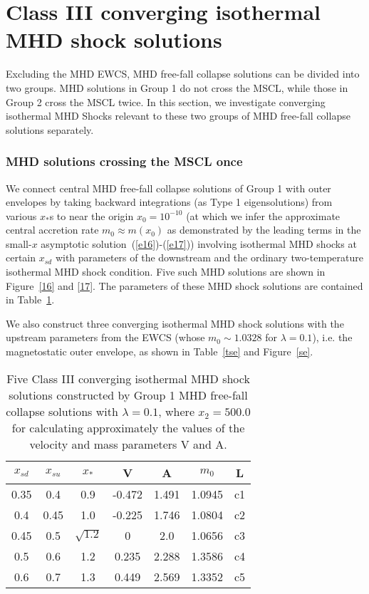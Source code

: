 \documentclass[fleqn,usenatbib]{mnras}
\begin{document}
\section{Class III converging isothermal MHD shock solutions}
\label{a4}


Excluding the MHD EWCS, MHD free-fall collapse solutions can be divided into two groups. MHD solutions in Group 1 do not cross the MSCL, while those in Group 2 cross the MSCL twice. In this section, we investigate converging isothermal MHD Shocks relevant to these two groups of MHD free-fall collapse solutions separately.  

\subsubsection{MHD solutions crossing the MSCL once}
\label{s5.3.1}
We connect central MHD free-fall collapse solutions of Group 1 with outer envelopes by taking backward integrations (as Type 1 eigensolutions) from various $x_{*}$s to near the origin $x_{0}=10^{-10}$ (at which we infer the approximate central accretion rate $m_{0}\approx m(x_{0})$ as demonstrated by the leading terms in the small-$x$ asymptotic solution~(\ref{e16})-(\ref{e17})) involving isothermal MHD shocks at certain $x_{sd}$ with parameters of the downstream and the ordinary two-temperature isothermal MHD shock condition. Five such MHD solutions are shown in Figure~\ref{16} and \ref{17}. The parameters of these MHD shock solutions are contained in Table~\ref{t4}.

We also construct three converging isothermal MHD shock solutions with the upstream parameters from the EWCS (whose $m_{0}\sim 1.0328$ for $\lambda=0.1$), i.e. the magnetostatic outer envelope, as shown in Table~\ref{tse} and Figure~\ref{se}. 

\begin{table}
\centering
\caption{Five Class III converging isothermal MHD shock solutions constructed by Group 1 MHD free-fall collapse solutions with $\lambda=0.1$, where $x_{2}=500.0$ for calculating approximately the values of the velocity and mass parameters V and A.}
\begin{tabular}{ccccccc}
\hline
$x_{sd}$ & $x_{su}$ & $x_{*}$ & V & A & $m_{0}$ & L\\
\hline
0.35 & 0.4 & 0.9 & -0.472 & 1.491 & 1.0945 & c1\\
0.4 & 0.45 & 1.0 & -0.225 & 1.746 & 1.0804 & c2\\
0.45 & 0.5 & $\sqrt{1.2}$ & 0 & 2.0 & 1.0656 & c3\\
0.5 & 0.6 & 1.2 & 0.235 & 2.288 & 1.3586 & c4\\
0.6 & 0.7 & 1.3 & 0.449 & 2.569 & 1.3352 & c5\\
\hline
\end{tabular}
\label{t4}
\end{table}
\end{document}
